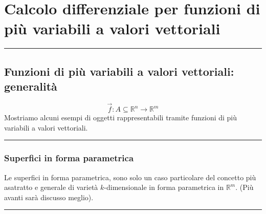 \section*{Calcolo differenziale per funzioni di più variabili a valori vettoriali}
\rule{\textwidth}{2pt}
\subsection*{Funzioni di più variabili a valori vettoriali: generalità}
\[
    \vec{f}: A\subseteq \mathbb{R}^n \rightarrow  \mathbb{R}^m
\]
Mostriamo alcuni esempi di oggetti rappresentabili tramite funzioni di più variabili a valori vettoriali.\newline
\rule{\textwidth}{0,4pt}
\subsubsection*{Superfici in forma parametrica}
Le superfici in forma parametrica, sono solo un caso particolare del concetto più asatratto e generale di varietà $k$-dimensionale in forma parametrica in $\mathbb{R}^m$. (Più avanti sarà discusso meglio).\newline
\rule{\textwidth}{0,4pt}
